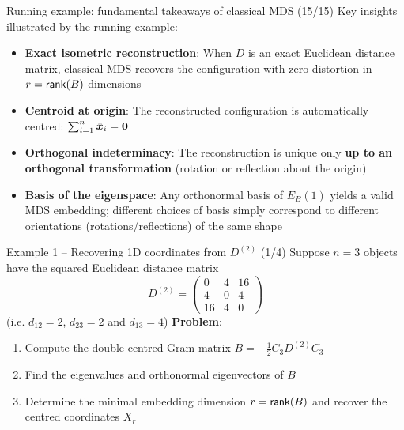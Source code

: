 \documentclass[aspectratio=169]{beamer}\usepackage[]{graphicx}\usepackage[]{xcolor}
\begin{document}
\begin{frame}{Running example: fundamental takeaways of classical MDS (15/15)}
Key insights illustrated by the running example:
\vfill
\begin{itemize}
\item \textbf{Exact isometric reconstruction}:
When $D$ is an exact Euclidean distance matrix, classical MDS recovers the configuration with zero distortion in $r = \mathsf{rank}(B)$ dimensions
\vfill
\item \textbf{Centroid at origin}:
The reconstructed configuration is automatically centred: $\sum_{i=1}^n \hat{\bx}_i = \b0$
\vfill
\item \textbf{Orthogonal indeterminacy}:
The reconstruction is unique only \textbf{up to an orthogonal transformation} (rotation or reflection about the origin)
\vfill
\item \textbf{Basis of the eigenspace}:
Any orthonormal basis of $E_B(1)$ yields a valid MDS embedding; different choices of basis simply correspond to different orientations (rotations/reflections) of the same shape
\end{itemize}
\end{frame}

\begin{frame}{Example 1 -- Recovering 1D coordinates from $D^{(2)}$ (1/4)}
Suppose $n=3$ objects have the squared Euclidean distance matrix
\[
D^{(2)} = \begin{pmatrix}
0 & 4 & 16 \\
4 & 0 & 4 \\
16 & 4 & 0
\end{pmatrix}
\]
(i.e. $d_{12} = 2$, $d_{23} = 2$ and $d_{13} = 4$)
\vfill
\textbf{Problem}:
\begin{enumerate}
\item Compute the double-centred Gram matrix $B = -\frac{1}{2}C_3 D^{(2)} C_3$
\item Find the eigenvalues and orthonormal eigenvectors of $B$
\item Determine the minimal embedding dimension $r = \mathsf{rank}(B)$ and recover the centred coordinates $X_r$
\end{enumerate}
\end{frame}
\end{document}
